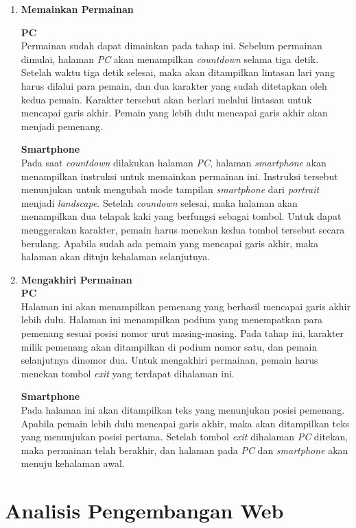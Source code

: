 \begin{enumerate}
	\item \textbf{Memainkan Permainan}
	
	\textbf{PC} \\
	Permainan sudah dapat dimainkan pada tahap ini. Sebelum permainan dimulai, halaman \textit{PC} akan menampilkan \textit{countdown} selama tiga detik. Setelah waktu tiga detik selesai, maka akan ditampilkan lintasan lari yang harus dilalui para pemain, dan dua karakter yang sudah ditetapkan oleh kedua pemain. Karakter tersebut akan berlari melalui lintasan untuk mencapai garis akhir. Pemain yang lebih dulu mencapai garis akhir akan menjadi pemenang.
	
	\textbf{Smartphone} \\
	Pada saat \textit{countdown} dilakukan halaman \textit{PC}, halaman \textit{smartphone} akan menampilkan instruksi untuk memainkan permainan ini. Instruksi tersebut menunjukan untuk mengubah mode tampilan \textit{smartphone} dari \textit{portrait} menjadi \textit{landscape}. Setelah \textit{coundown} selesai, maka halaman akan menampilkan dua telapak kaki yang berfungsi sebagai tombol. Untuk dapat menggerakan karakter, pemain harus menekan kedua tombol tersebut secara berulang. Apabila sudah ada pemain yang mencapai garis akhir, maka halaman akan dituju kehalaman selanjutnya.
	
	\item \textbf{Mengakhiri Permainan} \\
	
	\textbf{PC} \\
	Halaman ini akan menampilkan pemenang yang berhasil mencapai garis akhir lebih dulu. Halaman ini menampilkan podium yang menempatkan para pemenang sesuai posisi nomor urut masing-masing. Pada tahap ini, karakter milik pemenang akan ditampilkan di podium nomor satu, dan pemain selanjutnya dinomor dua. Untuk mengakhiri permainan, pemain harus menekan tombol \textit{exit} yang terdapat dihalaman ini.
	
	\textbf{Smartphone} \\
	Pada halaman ini akan ditampilkan teks yang menunjukan posisi pemenang. Apabila pemain lebih dulu mencapai garis akhir, maka akan ditampilkan teks yang menunjukan posisi pertama. Setelah tombol \textit{exit} dihalaman \textit{PC} ditekan, maka permainan telah berakhir, dan halaman pada \textit{PC} dan \textit{smartphone} akan menuju kehalaman awal.
	
\end{enumerate}

\section{Analisis Pengembangan Web}
\label{pengembangan}

